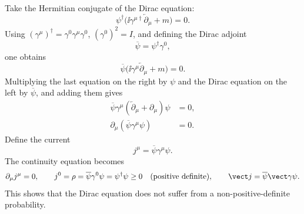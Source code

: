 Take the Hermitian conjugate of the Dirac equation:
\[
\psi^\dagger\bigl(\ii\gamma^{\mu\dagger}\overleftarrow{\partial}_\mu+m\bigr)=0.
\]
Using $(\gamma^\mu)^\dagger=\gamma^0\gamma^\mu\gamma^0$, $(\gamma^0)^2=I$, and defining the Dirac adjoint
\[
\overline\psi=\psi^\dagger\gamma^0,
\]
one obtains
\[
\overline\psi\bigl(\ii\gamma^\mu\overleftarrow{\partial}_\mu+m\bigr)=0.
\]
Multiplying the last equation on the right by $\psi$ and the Dirac equation on the left by $\overline\psi$, and adding them gives
\begin{align*}
\overline\psi\gamma^\mu(\overleftarrow\partial_\mu+\partial_\mu)\psi&=0,\\
\partial_\mu(\overline\psi\gamma^\mu\psi)&=0.
\end{align*}
Define the current
\[
j^\mu=\overline\psi\gamma^\mu\psi.
\]
The continuity equation becomes
\[
\partial_\mu j^\mu=0,\qquad
j^0=\rho=\overline\psi\gamma^0\psi=\psi^\dagger\psi\geq0
\quad\text{(positive definite)},\qquad
\vect j=\overline\psi\vect\gamma\psi.
\]
This shows that the Dirac equation does not suffer from a non-positive-definite probability.